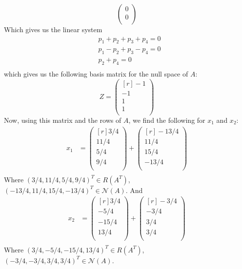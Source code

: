 \documentclass{article}
\begin{document}
\begin{itemize}
\[\begin{pmatrix}
            0\\
            0\\
        \end{pmatrix}\]
        Which gives us the linear system 
        \begin{align*}
            &p_1 + p_2 + p_3 + p_4 = 0 \\
            &p_1 - p_2 + p_3 - p_4 = 0 \\
            &p_2 + p_4 = 0\\
        \end{align*}
        which gives us the following basis matrix for the null space of $A$:
        \[Z = \begin{pmatrix*}[r]
            -1\\
            -1\\
            1\\
            1\\
        \end{pmatrix*}\]
        Now, using this matrix and the rows of $A$, we find the following for $x_1$ and $x_2$:
        \begin{align*}
            x_1 &= \begin{pmatrix*}[r]
                3/4\\
                11/4\\
                5/4\\
                9/4\\
            \end{pmatrix*} + \begin{pmatrix*}[r]
                -13/4\\
                11/4\\
                15/4\\
                -13/4\\
            \end{pmatrix*}\\
        \end{align*}
        Where $(3/4,11/4,5/4,9/4)^T \in R(A^T)$, $(-13/4,11/4,15/4,-13/4)^T \in \mathcal{N}(A)$. And
        \begin{align*}
            x_2 &= \begin{pmatrix*}[r]
                3/4\\
                -5/4\\
                -15/4\\
                13/4\\
            \end{pmatrix*} + \begin{pmatrix*}[r]
                -3/4\\
                -3/4\\
                3/4\\
                3/4\\
            \end{pmatrix*}\\
        \end{align*}    
        Where $(3/4, -5/4, -15/4, 13/4)^T \in R(A^T)$, $(-3/4,-3/4,3/4,3/4)^T \in \mathcal{N}(A)$.
        

\end{itemize}
\end{document}
